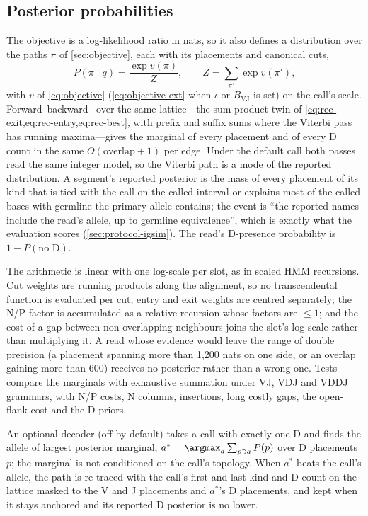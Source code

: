 \documentclass[11pt,a4paper]{article}
\begin{document}
\subsection{Posterior probabilities}
\label{sec:posterior}

The objective is a log-likelihood ratio in nats, so it also defines a
distribution over the paths $\pi$ of \cref{sec:objective}, each with its
placements and canonical cuts,
\begin{equation}
  P(\pi\mid q) = \frac{\exp v(\pi)}{Z},\qquad Z=\sum_{\pi'}\exp v(\pi'),
\end{equation}
with $v$ of \cref{eq:objective} (\cref{eq:objective-ext} when $\iota$ or
$B_{\mathrm{VJ}}$ is set) on the call's scale.
Forward--backward~\cite{rabiner1989,durbin1998} over the same lattice---the
sum-product twin of \cref{eq:rec-exit,eq:rec-entry,eq:rec-best}, with prefix
and suffix sums where the Viterbi pass has running maxima---gives the marginal
of every placement and of every D count in the same $O(\text{overlap}+1)$ per
edge. Under the default call both passes read the same integer model, so the
Viterbi path is a mode of the reported distribution. A segment's reported
posterior is the mass of every placement of its kind that is tied with the
call on the called interval or explains most of the called bases with
germline the primary allele contains; the event is ``the reported names
include the read's allele, up to germline equivalence'', which is exactly
what the evaluation scores (\cref{sec:protocol-igsim}). The read's D-presence
probability is $1-P(\text{no D})$.

The arithmetic is linear with one log-scale per slot, as in scaled HMM
recursions. Cut weights are running products along the alignment, so no
transcendental function is evaluated per cut; entry and exit weights are
centred separately; the N/P factor is accumulated as a relative recursion
whose factors are $\le 1$; and the cost of a gap between non-overlapping
neighbours joins the slot's log-scale rather than multiplying it. A read
whose evidence would leave the range of double precision (a placement
spanning more than 1,200 nats on one side, or an overlap gaining more than
600) receives no posterior rather than a wrong one. Tests compare the
marginals with exhaustive summation under VJ, VDJ and VDDJ grammars, with
N/P costs, N columns, insertions, long costly gaps, the open-flank cost and
the D priors.

An optional decoder (off by default) takes a call with exactly one D and
finds the allele of largest posterior marginal,
$a^{*}=\argmax_a\sum_{p\ni a}P(p)$ over D placements $p$; the marginal is
not conditioned on the call's topology. When $a^{*}$ beats the call's
allele, the path is re-traced with the call's first and last kind and D
count on the lattice masked to the V and J placements and $a^{*}$'s D
placements, and kept when it stays anchored and its reported D posterior is
no lower.
\end{document}
